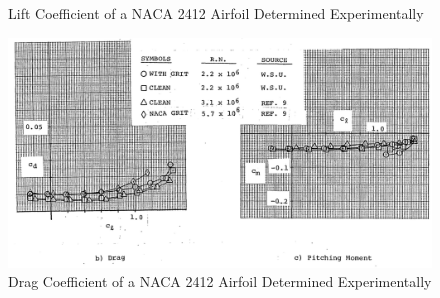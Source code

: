 \documentclass{article}
\begin{document}
\begin{figure}[h]
\begin{minipage}[b]{0.3\textwidth}
\caption{\label{fig:Exp 2412 Lift}Lift Coefficient of a NACA 2412 Airfoil Determined Experimentally}
\end{minipage}
\begin{minipage}[b]{0.69\textwidth}
\centering
\includegraphics[width=\textwidth]{Screenshot 2024-09-10 at 10.59.51 PM.png}
\caption{\label{fig:Exp 2412 Drag}Drag Coefficient of a NACA 2412 Airfoil Determined Experimentally}
\end{minipage}
\end{figure}
\end{document}
